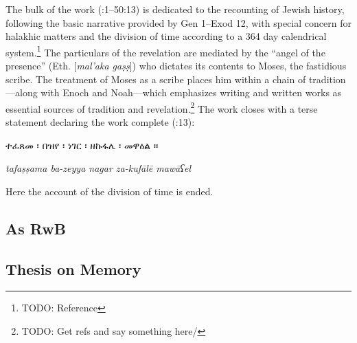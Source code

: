 The bulk of the work (:1--50:13) is dedicated to the recounting of Jewish history, following the basic narrative provided by Gen 1--Exod 12, with special concern for halakhic matters and the division of time according to a 364 day calendrical system.\footnote{TODO: Reference} The particulars of the revelation are mediated by the ``angel of the presence'' (Eth.  [\emph{mal'aka gaṣṣ}]) who dictates its contents to Moses, the fastidious scribe. The treatment of Moses as a scribe places him within a chain of tradition---along with Enoch and Noah---which emphasizes writing and written works as essential sources of tradition and revelation.\footnote{TODO: Get refs and say something here/} The work closes with a terse statement declaring the work complete (:13):

\begin{translation}
    \begin{otherlanguage}{amharic}
        ተፈጸመ ፡ በዝየ ፡ ነገር ፡ ዘኩፋሌ ፡ መዋዕል ።
    \end{otherlanguage}

    \emph{%
        tafaṣṣama ba-zeyya nagar za-kufālē mawāʕel
    }

    Here the account of the division of time is ended.

\end{translation}

    

\subsection{As RwB}


\subsection{Thesis on Memory}
